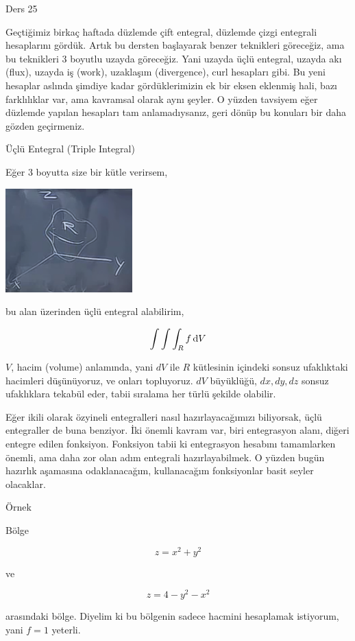 \documentclass[12pt,fleqn]{article}\usepackage{../../common}
\begin{document}
Ders 25

Geçtiğimiz birkaç haftada düzlemde çift entegral, düzlemde çizgi entegrali
hesaplarını gördük. Artık bu dersten başlayarak benzer teknikleri göreceğiz, ama
bu teknikleri 3 boyutlu uzayda göreceğiz. Yani uzayda üçlü entegral, uzayda akı
(flux), uzayda iş (work), uzaklaşım (divergence), curl hesapları gibi. Bu yeni
hesaplar aslında şimdiye kadar gördüklerimizin ek bir eksen eklenmiş hali, bazı
farklılıklar var, ama kavramsal olarak aynı şeyler. O yüzden tavsiyem eğer
düzlemde yapılan hesapları tam anlamadıysanız, geri dönüp bu konuları bir daha
gözden geçirmeniz.

Üçlü Entegral (Triple Integral)

Eğer 3 boyutta size bir kütle verirsem, 

\begin{center}
\includegraphics[height=4cm]{25_1.png}
\end{center}

bu alan üzerinden üçlü entegral alabilirim, 

$$ \int \int \int _R f \,\mathrm{d} V $$

$V$, hacim (volume) anlamında, yani $dV$ ile $R$ kütlesinin içindeki sonsuz
ufaklıktaki hacimleri düşünüyoruz, ve onları topluyoruz. $dV$ büyüklüğü,
$dx,dy,dz$ sonsuz ufaklıklara tekabül eder, tabii sıralama her türlü
şekilde olabilir.

Eğer ikili olarak özyineli entegralleri nasıl hazırlayacağımızı biliyorsak,
üçlü entegraller de buna benziyor. İki önemli kavram var, biri entegrasyon
alanı, diğeri entegre edilen fonksiyon. Fonksiyon tabii ki entegrasyon
hesabını tamamlarken önemli, ama daha zor olan adım entegrali
hazırlayabilmek. O yüzden bugün hazırlık aşamasına odaklanacağım,
kullanacağım fonksiyonlar basit seyler olacaklar.

Örnek 

Bölge 

$$z = x^2 + y^2$$

ve 

$$z = 4 - y^2 - x^2$$

arasındaki bölge. Diyelim ki bu bölgenin sadece hacmini hesaplamak
istiyorum, yani $f = 1$ yeterli.
\end{document}
